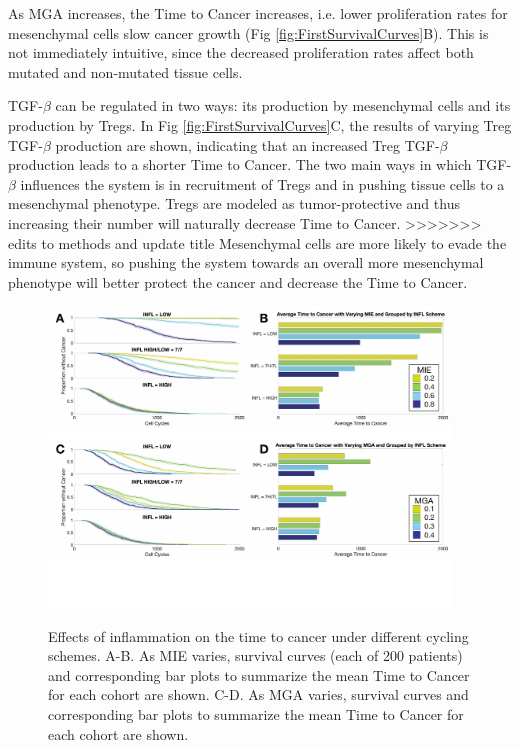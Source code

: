 \documentclass[11pt]{article}
\begin{document}
\par
As MGA increases, the Time to Cancer increases, i.e. lower proliferation rates for mesenchymal cells slow cancer growth (Fig \ref{fig:FirstSurvivalCurves}B).
This is not immediately intuitive, since the decreased proliferation rates affect both mutated and non-mutated tissue cells.
\par 
TGF-$\beta$ can be regulated in two ways: its production by mesenchymal cells and its production by Tregs. In Fig \ref{fig:FirstSurvivalCurves}C, the results of varying Treg TGF-$\beta$ production are shown, indicating that an increased Treg TGF-$\beta$ production leads to a shorter Time to Cancer.
The two main ways in which TGF-$\beta$ influences the system is in recruitment of Tregs and in pushing tissue cells to a mesenchymal phenotype.
Tregs are modeled as tumor-protective and thus increasing their number will naturally decrease Time to Cancer.
>>>>>>> edits to methods and update title
Mesenchymal cells are more likely to evade the immune system, so pushing the system towards an overall more mesenchymal phenotype will better protect the cancer and decrease the Time to Cancer.

\begin{figure}
\center
{\includegraphics[width=0.95\textwidth]{Figure4/Figure4.pdf}}
\caption{Effects of inflammation on the time to cancer under different cycling schemes. A-B. As MIE varies, survival curves (each of 200 patients)  and corresponding bar plots to summarize the mean Time to Cancer for each cohort are shown. C-D. As MGA varies, survival curves  and corresponding bar plots to summarize the mean Time to Cancer for each cohort are shown.}
\label{fig:VaryINFL_and_MesPars}
\end{figure}
\end{document}
